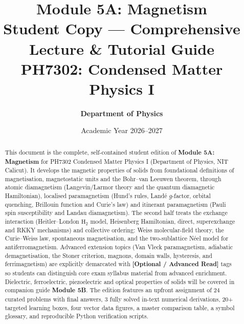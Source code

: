 \documentclass[11pt,a4paper]{article}
\begin{document}
\title{%
    \vspace{-1.5cm}
    \textbf{\LARGE Module 5A: Magnetism}\\[0.35cm]
    \Large Student Copy --- Comprehensive Lecture \& Tutorial Guide\\[0.25cm]
    \large\color{primary}\textbf{PH7302: Condensed Matter Physics I}
}
\author{%
    \textbf{Department of Physics}\\
}
\date{Academic Year 2026--2027}
\maketitle

\vspace{-0.6cm}
\begin{abstract}
\noindent
This document is the complete, self-contained student edition of \textbf{Module 5A: Magnetism} for PH7302 Condensed Matter Physics I (Department of Physics, NIT Calicut). It develops the magnetic properties of solids from foundational definitions of magnetisation, magnetostatic units and the Bohr--van Leeuwen theorem, through atomic diamagnetism (Langevin/Larmor theory and the quantum diamagnetic Hamiltonian), localised paramagnetism (Hund's rules, Land\'e $g$-factor, orbital quenching, Brillouin function and Curie's law) and itinerant paramagnetism (Pauli spin susceptibility and Landau diamagnetism). The second half treats the exchange interaction (Heitler--London $\mathrm{H}_2$ model, Heisenberg Hamiltonian, direct, superexchange and RKKY mechanisms) and collective ordering: Weiss molecular-field theory, the Curie--Weiss law, spontaneous magnetisation, and the two-sublattice N\'eel model for antiferromagnetism. Advanced extension topics (Van Vleck paramagnetism, adiabatic demagnetisation, the Stoner criterion, magnons, domain walls, hysteresis, and ferrimagnetism) are explicitly demarcated with \textbf{[Optional / Advanced Read]} tags so students can distinguish core exam syllabus material from advanced enrichment. Dielectric, ferroelectric, piezoelectric and optical properties of solids will be covered in companion guide \textbf{Module 5B}. The edition features an upfront assignment of 24 curated problems with final answers, 3 fully solved in-text numerical derivations, 20+ targeted learning boxes, four vector data figures, a master comparison table, a symbol glossary, and reproducible Python verification scripts.
\end{abstract}
\end{document}

